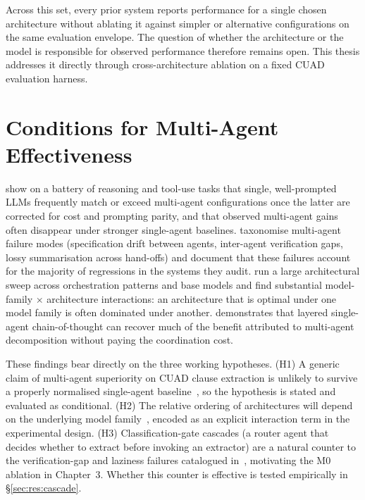 Across this set, every prior system reports performance for a single chosen architecture
without ablating it against simpler or alternative configurations on the same evaluation
envelope. The question of whether the architecture or the model is responsible for
observed performance therefore remains open. This thesis addresses it directly through
cross-architecture ablation on a fixed CUAD evaluation harness.

\section{Conditions for Multi-Agent Effectiveness}\label{sec:lit:when}

\textcite{gao2025single} show on a battery of
reasoning and tool-use tasks that single, well-prompted LLMs frequently match or exceed
multi-agent configurations once the latter are corrected for cost and prompting parity,
and that observed multi-agent gains often disappear under stronger single-agent baselines.
\textcite{cemri2025why} taxonomise multi-agent failure modes
(specification drift between agents, inter-agent verification gaps, lossy
summarisation across hand-offs) and document that these failures account for
the majority of regressions in the systems they audit. \textcite{bogavelli2025agentarch}
run a large architectural sweep across orchestration patterns and base models and find
substantial model-family $\times$ architecture interactions: an architecture that is
optimal under one model family is often dominated under another.
\textcite{sanwal2025layered} demonstrates that layered single-agent chain-of-thought
can recover much of the benefit attributed to multi-agent decomposition without paying
the coordination cost.

These findings bear directly on the three working hypotheses. (H1) A generic claim of
multi-agent superiority on CUAD clause extraction is unlikely to survive a
properly normalised single-agent baseline~\cite{gao2025single}, so the hypothesis is
stated and evaluated as conditional. (H2) The relative ordering of architectures will
depend on the underlying model family~\cite{bogavelli2025agentarch}, encoded as an
explicit interaction term in the experimental design. (H3) Classification-gate
cascades (a router agent that decides whether to extract before invoking an
extractor) are a natural counter to the verification-gap and laziness failures
catalogued in~\cite{cemri2025why}, motivating the M0 ablation in Chapter~3.
Whether this counter is effective is tested empirically in §\ref{sec:res:cascade}.

